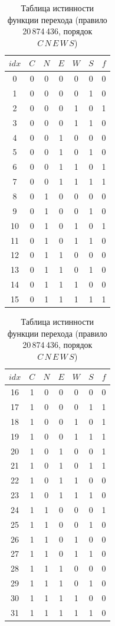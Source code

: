 \begin{table}[H]
	\centering
	\caption{Таблица истинности функции перехода (правило 20\,874\,436, порядок $C\,N\,E\,W\,S$)}
	\label{tab:truth}
	\small
	\begin{tabular}{|c|ccccc|c|}
		\hline
		$idx$ & $C$ & $N$ & $E$ & $W$ & $S$ & $f$ \\
		\hline
		0 & 0 & 0 & 0 & 0 & 0 & 0 \\
		1 & 0 & 0 & 0 & 0 & 1 & 0 \\
		2 & 0 & 0 & 0 & 1 & 0 & 1 \\
		3 & 0 & 0 & 0 & 1 & 1 & 0 \\
		4 & 0 & 0 & 1 & 0 & 0 & 0 \\
		5 & 0 & 0 & 1 & 0 & 1 & 0 \\
		6 & 0 & 0 & 1 & 1 & 0 & 1 \\
		7 & 0 & 0 & 1 & 1 & 1 & 1 \\
		8 & 0 & 1 & 0 & 0 & 0 & 0 \\
		9 & 0 & 1 & 0 & 0 & 1 & 0 \\
		10 & 0 & 1 & 0 & 1 & 0 & 1 \\
		11 & 0 & 1 & 0 & 1 & 1 & 0 \\
		12 & 0 & 1 & 1 & 0 & 0 & 0 \\
		13 & 0 & 1 & 1 & 0 & 1 & 0 \\
		14 & 0 & 1 & 1 & 1 & 0 & 0 \\
		15 & 0 & 1 & 1 & 1 & 1 & 1 \\
		\hline
	\end{tabular}
	\hspace{1cm}
	\begin{tabular}{|c|ccccc|c|}
		\hline
		$idx$ & $C$ & $N$ & $E$ & $W$ & $S$ & $f$ \\
		\hline
		16 & 1 & 0 & 0 & 0 & 0 & 0 \\
		17 & 1 & 0 & 0 & 0 & 1 & 1 \\
		18 & 1 & 0 & 0 & 1 & 0 & 1 \\
		19 & 1 & 0 & 0 & 1 & 1 & 1 \\
		20 & 1 & 0 & 1 & 0 & 0 & 1 \\
		21 & 1 & 0 & 1 & 0 & 1 & 1 \\
		22 & 1 & 0 & 1 & 1 & 0 & 0 \\
		23 & 1 & 0 & 1 & 1 & 1 & 0 \\
		24 & 1 & 1 & 0 & 0 & 0 & 1 \\
		25 & 1 & 1 & 0 & 0 & 1 & 0 \\
		26 & 1 & 1 & 0 & 1 & 0 & 0 \\
		27 & 1 & 1 & 0 & 1 & 1 & 0 \\
		28 & 1 & 1 & 1 & 0 & 0 & 0 \\
		29 & 1 & 1 & 1 & 0 & 1 & 0 \\
		30 & 1 & 1 & 1 & 1 & 0 & 0 \\
		31 & 1 & 1 & 1 & 1 & 1 & 0 \\
		\hline
	\end{tabular}
\end{table}

